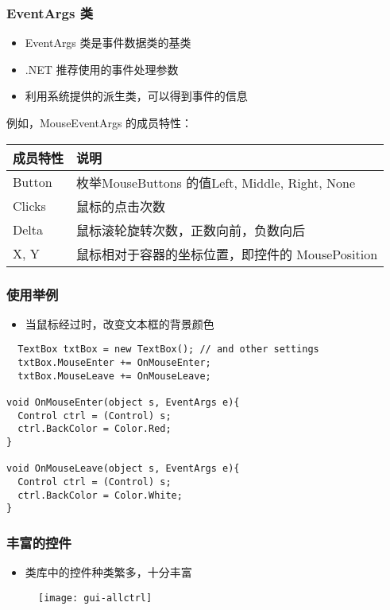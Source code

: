 \begin{frame}
\frametitle{EventArgs 类}
\begin{itemize}
\item EventArgs 类是事件数据类的基类
\item .NET 推荐使用的事件处理参数
\item 利用系统提供的派生类，可以得到事件的信息
\end{itemize}
\medskip

例如，MouseEventArgs 的成员特性：

\begin{tabular}{l|l}
\hline
成员特性 & 说明                                             \\  
\hline
Button   & 枚举MouseButtons 的值Left, Middle, Right, None \\
Clicks   & 鼠标的点击次数                                   \\
Delta    & 鼠标滚轮旋转次数，正数向前，负数向后             \\
X, Y     & 鼠标相对于容器的坐标位置，即控件的 MousePosition \\
\hline
\end{tabular}
\end{frame}

\begin{frame}[fragile]
\frametitle{使用举例}
\begin{itemize}
\item 当鼠标经过时，改变文本框的背景颜色
\end{itemize}
\begin{lstlisting}
  TextBox txtBox = new TextBox(); // and other settings
  txtBox.MouseEnter += OnMouseEnter;
  txtBox.MouseLeave += OnMouseLeave;

void OnMouseEnter(object s, EventArgs e){
  Control ctrl = (Control) s;
  ctrl.BackColor = Color.Red;
}

void OnMouseLeave(object s, EventArgs e){
  Control ctrl = (Control) s;
  ctrl.BackColor = Color.White;
}

\end{lstlisting}
\end{frame}

\begin{frame}
\frametitle{丰富的控件}
\begin{itemize}
\item 类库中的控件种类繁多，十分丰富
\end{itemize}
\begin{figure}[htbp]
  \centering
  \texttt{[image: gui-allctrl]}
\end{figure}
\end{frame}

